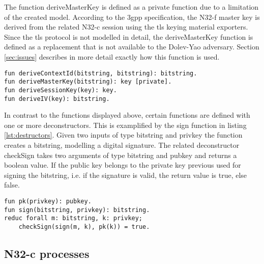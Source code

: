 The function deriveMasterKey is defined as a private function due to a limitation of the created model.
According to the \gls{3gpp} specification, the N32-f master key is derived from the related N32-c session using the \gls{tls} keying material exporters.
Since the \gls{tls} protocol is not modelled in detail, the deriveMasterKey function is defined as a replacement that is not available to the Dolev-Yao adversary.
Section \ref{sec:issues} describes in more detail exactly how this function is used.

\begin{lstlisting}[caption={Definition of custom on-way functions},label={lst:functions},firstnumber=82]
fun deriveContextId(bitstring, bitstring): bitstring.
fun deriveMasterKey(bitstring): key [private].
fun deriveSessionKey(key): key.
fun deriveIV(key): bitstring.
\end{lstlisting}

In contrast to the functions displayed above, certain functions are defined with one or more deconstructors.
This is examplified by the sign function in listing \ref{lst:destructors}.
Given two inputs of type bitstring and privkey the function creates a bitstring, modelling a digital signature.
The related deconstructor checkSign takes two arguments of type bitstring and pubkey and returns a boolean value.
If the public key belongs to the private key previous used for signing the bitstring, i.e. if the signature is valid, the return value is true, else false.

\begin{lstlisting}[caption={Definition of custom functions and destructors},label={lst:destructors},firstnumber=91]
fun pk(privkey): pubkey.
fun sign(bitstring, privkey): bitstring.
reduc forall m: bitstring, k: privkey;
    checkSign(sign(m, k), pk(k)) = true.
\end{lstlisting}

\subsection{N32-c processes}

